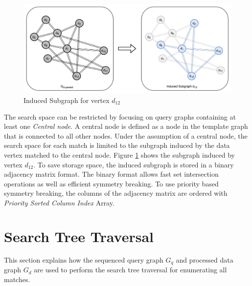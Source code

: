 \begin{figure}
    \includegraphics[width=\textwidth]{fig/LR/Induced-subgraph.png}
    \caption{Induced Subgraph for vertex $d_{12}$}
    \label{fig:induced-subgraph}
\end{figure}

The search space can be restricted by focusing on query graphs containing at least one \textit{Central node}.
A central node is defined as a node in the template graph that is connected to all other nodes.
Under the assumption of a central node, the search space for each match is limited to the subgraph induced by the data vertex matched to the central node.
Figure \ref{fig:induced-subgraph} shows the subgraph induced by vertex $d_{12}$.
To save storage space, the induced subgraph is stored in a binary adjacency matrix format.
The binary format allows fast set intersection operations as well as efficient symmetry breaking.
To use priority based symmetry breaking, the columns of the adjacency matrix are ordered with \textit{Priority Sorted Column Index} Array.

\section{Search Tree Traversal}\label{DFS-T}
This section explains how the sequenced query graph $G_q$ and processed data graph $G_d$ are used to perform the search tree traversal for enumerating all matches.

